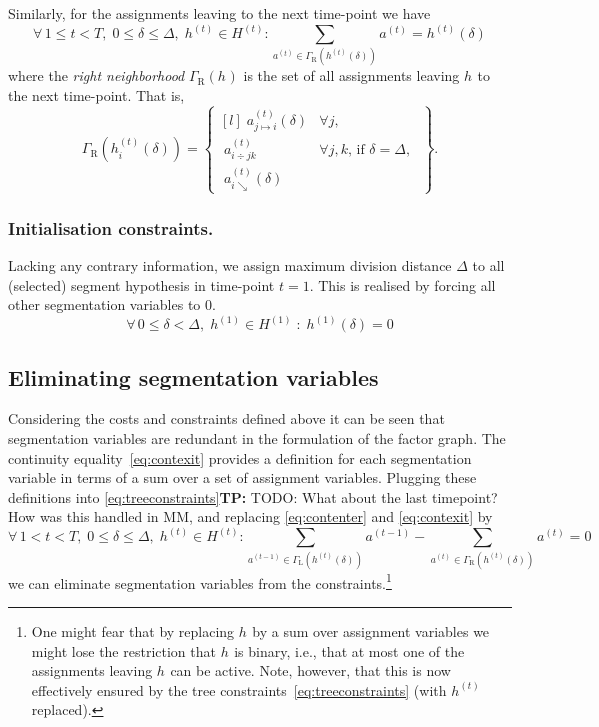 \documentclass[a4paper]{article}
\newcommand{\TP}[1]{{\color{Red}\sc \textbf{TP:} #1}{}}
\newcommand{\hypset}[1]{\ensuremath{H^{(#1)}}\xspace}
\newcommand{\vhset}[1]{\hypset{#1}}
\newcommand{\Ht}[1][t]{\vhset{#1}}
\newcommand{\vh}[1][]{\ensuremath{h_{#1}}\xspace}
\newcommand{\vht}[1][t]{\ensuremath{h^{(#1)}}\xspace}
\newcommand{\vhtd}[2][t]{\ensuremath{h^{(#1)}\left({#2}\right)}\xspace}
\newcommand{\vhtid}[3][t]{\ensuremath{h^{(#1)}_{#2}\left({#3}\right)}\xspace}
\newcommand{\vat}[1][t]{\ensuremath{a^{(#1)}}\xspace}
\newcommand{\vamd}[4]{\ensuremath{a^{(#1)}_{#2\mapsto#3}\left(#4\right)}\xspace}
\newcommand{\vad}[3]{\ensuremath{a^{(#1)}_{#2\div#3}}\xspace}
\newcommand{\vaed}[3]{\ensuremath{a^{(#1)}_{#2\searrow}\left(#3\right)}\xspace}
\newcommand{\Gr}[1]{\ensuremath{\Gamma_{\text{R}}\left(#1\right)}\xspace}
\newcommand{\Gl}[1]{\ensuremath{\Gamma_{\text{L}}\left(#1\right)}\xspace}
\newcommand{\ie}{i.e.{}}
\begin{document}
\noindent
Similarly, for the assignments leaving to the next time-point we have
\begin{equation}\label{eq:contexit}
  \forall\, 1 \le t < T,\;
  0 \le \delta \le \Delta,\;
  \vht \in \Ht:
    \sum_{\vat \in \Gr{\vhtd{\delta}}} \vat
  = \vhtd{\delta}
\end{equation}
where the \emph{right neighborhood} \Gr{\vh} is the set of all assignments leaving \vh to the next time-point.
That is,
\begin{equation}
	\Gr{\vhtid{i}{\delta}}
	= \begin{Bmatrix*}[l]
			\; \vamd{t}{j}{i}{\delta}   & \forall j, \\[4mm]
			\; \vad{t}{i}{jk}           & \forall j, k \text{, if } \delta = \Delta,\; \\[4mm]
			\; \vaed{t}{i}{\delta} & 
		\end{Bmatrix*}.
\end{equation}
%
%
\subsubsection{Initialisation constraints.}
%
%
Lacking any contrary information, we assign maximum division distance $\Delta$ to all (selected) segment hypothesis in time-point $t = 1$. This is realised by forcing all other segmentation variables to $0$.
\begin{equation}
	\forall\, 0 \le \delta < \Delta,\; \vht[1] \in \Ht[1]\;:\; \vhtd[1]{\delta} = 0
\end{equation}

%
%
\subsection{Eliminating segmentation variables}
\label{sec:varelim}
%
Considering the costs and constraints defined above it can be seen that segmentation variables are redundant in the formulation of the factor graph.
The continuity equality~\eqref{eq:contexit} provides a definition for each segmentation variable in terms of a sum over a set of assignment variables.
Plugging these definitions into \eqref{eq:treeconstraints}\TP{TODO: What about the last timepoint? How was this handled in MM}, and replacing \eqref{eq:contenter} and \eqref{eq:contexit} by
\begin{equation}
  \forall\, 1 < t < T,\; 0 \le \delta \le \Delta,\; \vht \in \Ht:
    \!\!\!\!\!
    \sum_{\vat[t-1] \in \Gl{\vhtd{\delta}}}
    \!\!\!\!\!
      \vat[t-1]
  -
    \!\!\!\!\!
    \sum_{\vat \in \Gr{\vhtd{\delta}}}
    \!\!\!\!\!
      \vat = 0
\end{equation}
we can eliminate segmentation variables from the constraints.\footnote{%
One might fear that by replacing \vh by a sum over assignment variables we might lose the restriction that \vh is binary, \ie, that at most one of the
  assignments leaving \vh can be active.
Note, however, that this is now effectively ensured by the tree constraints~\eqref{eq:treeconstraints} (with \vht replaced).}
\end{document}
